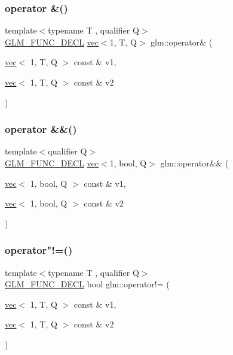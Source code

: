 \subsubsection{\texorpdfstring{operator \&()}{operator \&()}\hspace{0.1cm}{\footnotesize\ttfamily [3/3]}}
{\footnotesize\ttfamily template$<$typename T , qualifier Q$>$ \\
\hyperlink{setup_8hpp_ab2d052de21a70539923e9bcbf6e83a51}{G\+L\+M\+\_\+\+F\+U\+N\+C\+\_\+\+D\+E\+CL} \hyperlink{structglm_1_1vec}{vec}$<$1, T, Q$>$ glm\+::operator\& (\begin{DoxyParamCaption}\item[{\hyperlink{structglm_1_1vec}{vec}$<$ 1, T, Q $>$ const \&}]{v1,  }\item[{\hyperlink{structglm_1_1vec}{vec}$<$ 1, T, Q $>$ const \&}]{v2 }\end{DoxyParamCaption})}

\mbox{\label{group__ext__vec1_ga5836cbb5b58489de3281dc7460e4f2ce}} 
\subsubsection{\texorpdfstring{operator \&\&()}{operator \&\&()}}
{\footnotesize\ttfamily template$<$qualifier Q$>$ \\
\hyperlink{setup_8hpp_ab2d052de21a70539923e9bcbf6e83a51}{G\+L\+M\+\_\+\+F\+U\+N\+C\+\_\+\+D\+E\+CL} \hyperlink{structglm_1_1vec}{vec}$<$1, bool, Q$>$ glm\+::operator\&\& (\begin{DoxyParamCaption}\item[{\hyperlink{structglm_1_1vec}{vec}$<$ 1, bool, Q $>$ const \&}]{v1,  }\item[{\hyperlink{structglm_1_1vec}{vec}$<$ 1, bool, Q $>$ const \&}]{v2 }\end{DoxyParamCaption})}

\mbox{\label{group__ext__vec1_gadc81ac3efb2cc1678cb7ebe126d2e26d}} 
\subsubsection{\texorpdfstring{operator"!=()}{operator!=()}}
{\footnotesize\ttfamily template$<$typename T , qualifier Q$>$ \\
\hyperlink{setup_8hpp_ab2d052de21a70539923e9bcbf6e83a51}{G\+L\+M\+\_\+\+F\+U\+N\+C\+\_\+\+D\+E\+CL} bool glm\+::operator!= (\begin{DoxyParamCaption}\item[{\hyperlink{structglm_1_1vec}{vec}$<$ 1, T, Q $>$ const \&}]{v1,  }\item[{\hyperlink{structglm_1_1vec}{vec}$<$ 1, T, Q $>$ const \&}]{v2 }\end{DoxyParamCaption})}

